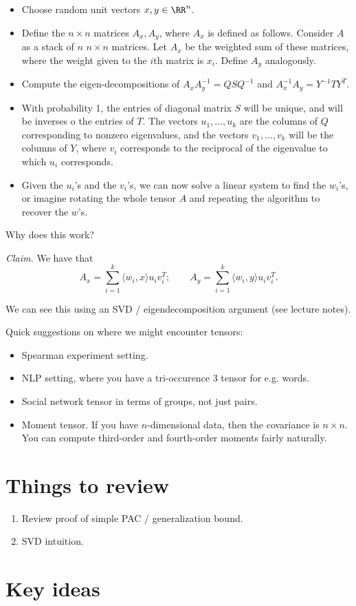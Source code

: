 \begin{itemize}
  \item Choose random unit vectors $x, y \in \RR^n$.
  \item Define the $n \times n$ matrices $A_x, A_y$, where $A_x$ is defined as follows.  Consider $A$ as a stack of $n$ $n \times n$ matrices.  Let $A_x$ be the weighted sum of these matrices, where the weight given to the $i$th matrix is $x_i$.  Define $A_y$ analogously.
  \item Compute the eigen-decompositions of $A_x A_y^{-1} = QSQ^{-1}$ and $A_{x}^{-1} A_y = Y^{-1} T Y^T$.
  \item With probability 1, the entries of diagonal matrix $S$ will be unique, and will be inverses o the entries of $T$.  The vectors $u_1, \dots, u_k$ are the columns of $Q$ corresponding to nonzero eigenvalues, and the vectors $v_1, \dots, v_k$ will be the columns of $Y$, where $v_i$ corresponds to the reciprocal of the eigenvalue to which $u_i$ corresponds.

  \item Given the $u_i$'s and the $v_i$'s, we can now solve a linear system to find the $w_i$'s, or imagine rotating the whole tensor $A$ and repeating the algorithm to recover the $w$'s.
\end{itemize}

Why does this work?

{\it Claim.} We have that
\[
  A_x = \sum_{i=1}^{k} \langle w_i, x \rangle u_i v_i^T; \qquad A_y = \sum_{i=1}^{k} \langle w_i, y \rangle u_i v_i^T.
\]

We can see this using an SVD / eigendecomposition argument (see lecture notes).

Quick suggestions on where we might encounter tensors:

\begin{itemize}
  \item Spearman experiment setting.
  \item NLP setting, where you have a tri-occurence 3 tensor for e.g. words.
  \item Social network tensor in terms of groups, not just pairs.
  \item Moment tensor.  If you have $n$-dimensional data, then the covariance is $n \times n$.  You can compute third-order and fourth-order moments fairly naturally.
\end{itemize}

\section{Things to review}

\begin{enumerate}
  \item Review proof of simple PAC / generalization bound.
  \item SVD intuition.
\end{enumerate}


\section{Key ideas}


%
